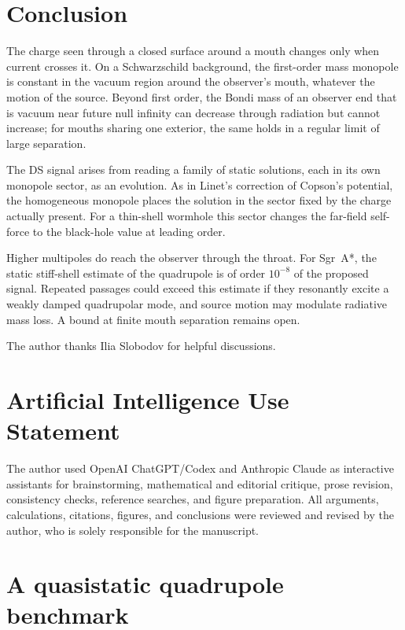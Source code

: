 \documentclass[aps,prd,10pt,onecolumn,nofootinbib,superscriptaddress,floatfix]{revtex4-2}
\begin{document}
\section{Conclusion}
\label{sec:conclusion}

The charge seen through a closed surface around a mouth changes only when
current crosses it.  On a Schwarzschild background, the first-order mass
monopole is constant in the vacuum region around the observer's mouth,
whatever the motion of the source.  Beyond first order, the Bondi mass of an
observer end that is vacuum near future null infinity can decrease through
radiation but cannot increase; for mouths sharing one exterior, the same
holds in a regular limit of large separation.

The DS signal arises from reading a family of static solutions, each in its
own monopole sector, as an evolution.  As in Linet's correction of Copson's
potential, the homogeneous monopole places the solution in the sector fixed
by the charge actually present.  For a thin-shell wormhole this sector
changes the far-field self-force to the black-hole value at leading order.

Higher multipoles do reach the observer through the throat.  For Sgr~A*, the
static stiff-shell estimate of the quadrupole is of order $10^{-8}$ of the
proposed signal.  Repeated passages could exceed this estimate if they
resonantly excite a weakly damped quadrupolar mode, and source motion may
modulate radiative mass loss.  A bound at finite mouth separation remains
open.

\begin{acknowledgments}
The author thanks Ilia Slobodov for helpful discussions.
\end{acknowledgments}

\section*{Artificial Intelligence Use Statement}

The author used OpenAI ChatGPT/Codex and Anthropic Claude as interactive
assistants for brainstorming, mathematical and editorial critique, prose
revision, consistency checks, reference searches, and figure preparation.  All
arguments, calculations, citations, figures, and conclusions were reviewed and
revised by the author, who is solely responsible for the manuscript.

\appendix
\section{A quasistatic quadrupole benchmark}
\label{app:quadrupole}
\end{document}
